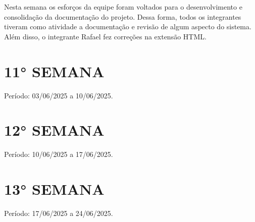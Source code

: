 \documentclass[
	12pt,				%
	openany,			%
	twoside,			%
	a4paper,			%
	english,			%
	french,				%
	spanish,			%
	brazil				%
	]{abntex2}
\begin{document}
\begin{apendicesenv}
Nesta semana os esforços da equipe foram voltados para o desenvolvimento e consolidação da documentação do projeto. 
Dessa forma, todos os integrantes tiveram como atividade a documentação e revisão de algum aspecto do sistema.  Além disso, o
integrante Rafael fez correções na extensão HTML.

\section{11° SEMANA}
Período: 03/06/2025 a 10/06/2025.

\section{12° SEMANA}
Período: 10/06/2025 a 17/06/2025.

\section{13° SEMANA}
Período: 17/06/2025 a 24/06/2025.



\end{apendicesenv}








\printindex
\end{document}
